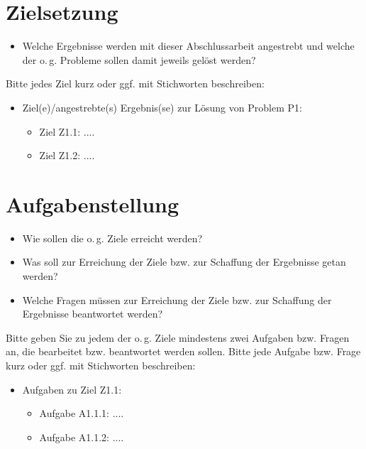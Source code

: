 \section{Zielsetzung}\label{sec:zielsetzung}

\begin{itemize}
\item Welche Ergebnisse werden mit dieser Abschlussarbeit angestrebt und welche der o.\,g. Probleme sollen damit jeweils gelöst werden?
\end{itemize}
Bitte jedes Ziel kurz oder ggf. mit Stichworten beschreiben:
\begin{itemize}
\item Ziel(e)/angestrebte(s) Ergebnis(se) zur Lösung von Problem P1:
	\begin{itemize}
	\item Ziel Z1.1: ....
	\item Ziel Z1.2: ....
	\end{itemize}
\end{itemize}

\section{Aufgabenstellung}

\begin{itemize}
\item Wie sollen die o.\,g. Ziele erreicht werden?
\item Was soll zur Erreichung der Ziele bzw. zur Schaffung der Ergebnisse getan werden?
\item Welche Fragen müssen zur Erreichung der Ziele bzw. zur Schaffung der Ergebnisse beantwortet  werden?
\end{itemize}


Bitte geben Sie zu jedem der o.\,g. Ziele mindestens zwei Aufgaben bzw. Fragen an, die bearbeitet bzw. beantwortet werden sollen. Bitte jede Aufgabe bzw. Frage kurz oder ggf. mit Stichworten beschreiben:

\begin{itemize}
\item Aufgaben zu Ziel Z1.1:
	\begin{itemize}
	\item Aufgabe A1.1.1: ....
	\item Aufgabe A1.1.2: ....
	\end{itemize}
\end{itemize}
